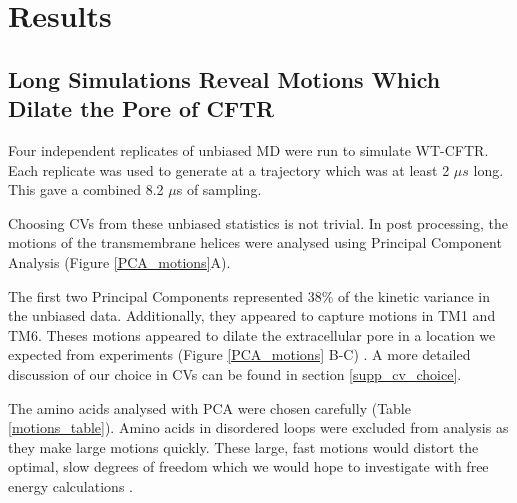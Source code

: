 \section{Results}

\subsection{Long Simulations Reveal Motions Which Dilate the Pore of CFTR}
Four independent replicates of unbiased MD were run to simulate WT-CFTR. Each replicate was used to generate at a trajectory which was at least 2 $\mu s$ long. This gave a combined 8.2 $\mu$s of sampling. 

Choosing CVs from these unbiased statistics is not trivial. In post processing, the motions of the transmembrane helices were analysed using Principal Component Analysis \cite{pearson1901, hotelling1936} (Figure \ref{PCA_motions}A). 

The first two Principal Components represented 38\% of the kinetic variance in the unbiased data. Additionally, they appeared to capture motions in TM1 and TM6. Theses motions appeared to dilate the extracellular pore in a location we expected from experiments (Figure \ref{PCA_motions} B-C) \cite{linsdell2018, negoda2018, negoda2019}. A more detailed discussion of our choice in CVs can be found in section \ref{supp_cv_choice}. 

The amino acids analysed with PCA were chosen carefully (Table \ref{motions_table}). Amino acids in disordered loops were excluded from analysis as they make large motions quickly. These large, fast motions would distort the optimal, slow degrees of freedom which we would hope to investigate with free energy calculations \cite{noe2001}. 

